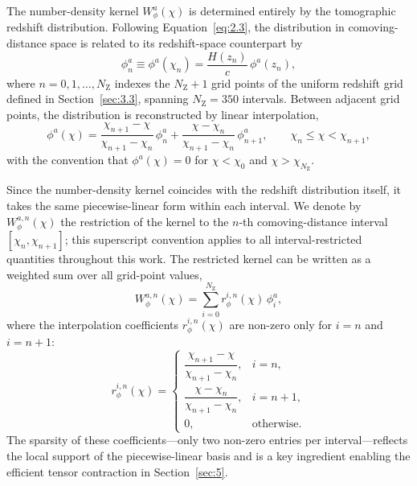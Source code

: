 The number-density kernel \(W_\phi^a(\chi)\) is determined entirely by the tomographic redshift distribution. Following Equation~\ref{eq:2.3}, the distribution in comoving-distance space is related to its redshift-space counterpart by
\begin{equation} \label{eq:4.2}
    \phi^{a}_{n} \equiv \phi^a(\chi_n) = \frac{H(z_n)}{c}\,\phi^{a}(z_n),
\end{equation}
where \(n = 0, 1, \ldots, N_\mathrm{Z}\) indexes the \(N_\mathrm{Z} + 1\) grid points of the uniform redshift grid defined in Section~\ref{sec:3.3}, spanning \(N_\mathrm{Z} = 350\) intervals. Between adjacent grid points, the distribution is reconstructed by linear interpolation,
\begin{equation} \label{eq:4.3}
    \phi^{a}(\chi) = \frac{\chi_{n+1} - \chi}{\chi_{n+1} - \chi_n}\,\phi^{a}_{n} + \frac{\chi - \chi_n}{\chi_{n+1} - \chi_n}\,\phi^{a}_{n+1}, \qquad \chi_n \le \chi < \chi_{n+1},
\end{equation}
with the convention that \(\phi^{a}(\chi) = 0\) for \(\chi < \chi_0\) and \(\chi > \chi_{N_\mathrm{Z}}\).

Since the number-density kernel coincides with the redshift distribution itself, it takes the same piecewise-linear form within each interval. We denote by \(W_\phi^{a,n}(\chi)\) the restriction of the kernel to the \(n\)-th comoving-distance interval \([\chi_n, \chi_{n+1}]\); this superscript convention applies to all interval-restricted quantities throughout this work. The restricted kernel can be written as a weighted sum over all grid-point values,
\begin{equation} \label{eq:4.4}
    W_\phi^{a,n}(\chi) = \sum_{i=0}^{N_\mathrm{Z}} r_\phi^{i,n}(\chi)\,\phi^{a}_{i},
\end{equation}
where the interpolation coefficients \(r_\phi^{i,n}(\chi)\) are non-zero only for \(i = n\) and \(i = n+1\):
\begin{equation} \label{eq:4.5}
    r_\phi^{i,n}(\chi) =
    \begin{cases}
        \dfrac{\chi_{n+1} - \chi}{\chi_{n+1} - \chi_n}, & i = n, \\[8pt]
        \dfrac{\chi - \chi_n}{\chi_{n+1} - \chi_n}, & i = n+1, \\[8pt]
        0, & \text{otherwise}.
    \end{cases}
\end{equation}
The sparsity of these coefficients---only two non-zero entries per interval---reflects the local support of the piecewise-linear basis and is a key ingredient enabling the efficient tensor contraction in Section~\ref{sec:5}.

